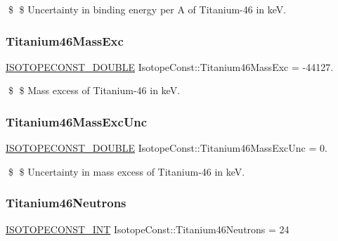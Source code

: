 \$ \$ Uncertainty in binding energy per A of Titanium-\/46 in keV. \mbox{\label{group___isotope_const-_titanium-_ti46_gac106d432216c4b4fed4c3141342a37c0}} 
\subsubsection{\texorpdfstring{Titanium46\+Mass\+Exc}{Titanium46MassExc}}
{\footnotesize\ttfamily \mbox{\hyperlink{group___isotope_const-_macros_ga8f45a7272ce02c0b4c65c44636ed719a}{I\+S\+O\+T\+O\+P\+E\+C\+O\+N\+S\+T\+\_\+\+D\+O\+U\+B\+LE}} Isotope\+Const\+::\+Titanium46\+Mass\+Exc = -\/44127.}

\$ \$ Mass excess of Titanium-\/46 in keV. \mbox{\label{group___isotope_const-_titanium-_ti46_ga79771c8c55d5c149020832e55124522f}} 
\subsubsection{\texorpdfstring{Titanium46\+Mass\+Exc\+Unc}{Titanium46MassExcUnc}}
{\footnotesize\ttfamily \mbox{\hyperlink{group___isotope_const-_macros_ga8f45a7272ce02c0b4c65c44636ed719a}{I\+S\+O\+T\+O\+P\+E\+C\+O\+N\+S\+T\+\_\+\+D\+O\+U\+B\+LE}} Isotope\+Const\+::\+Titanium46\+Mass\+Exc\+Unc = 0.}

\$ \$ Uncertainty in mass excess of Titanium-\/46 in keV. \mbox{\label{group___isotope_const-_titanium-_ti46_ga43cbefdca1c07fc543f20c914979cb47}} 
\subsubsection{\texorpdfstring{Titanium46\+Neutrons}{Titanium46Neutrons}}
{\footnotesize\ttfamily \mbox{\hyperlink{group___isotope_const-_macros_ga5f18360b3e99483a35c32d789e62621c}{I\+S\+O\+T\+O\+P\+E\+C\+O\+N\+S\+T\+\_\+\+I\+NT}} Isotope\+Const\+::\+Titanium46\+Neutrons = 24}

